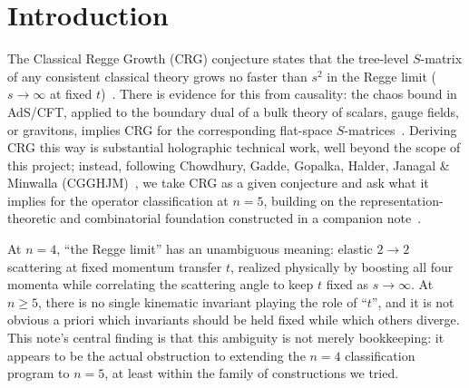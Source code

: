 \documentclass[reqno]{amsart}
\begin{document}
\maketitle
\tableofcontents

\section{Introduction}

The Classical Regge Growth (CRG) conjecture states that the tree-level $S$-matrix of any
consistent classical theory grows no faster than $s^2$ in the Regge limit ($s\to\infty$ at fixed
$t$)~\cite{cgghjm2019}. There is evidence for this from causality: the chaos bound in AdS/CFT,
applied to the boundary dual of a bulk theory of scalars, gauge fields, or gravitons, implies CRG
for the corresponding flat-space $S$-matrices~\cite{chaosbound2021}. Deriving CRG this way is
substantial holographic technical work, well beyond the scope of this project; instead, following
Chowdhury, Gadde, Gopalka, Halder, Janagal \& Minwalla (CGGHJM)~\cite{cgghjm2019}, we take CRG as a
given conjecture and ask what it implies for the operator classification at $n=5$, building on the
representation-theoretic and combinatorial foundation constructed in a companion
note~\cite{fivephotons}.

At $n=4$, ``the Regge limit'' has an unambiguous meaning: elastic $2\to2$ scattering at fixed
momentum transfer $t$, realized physically by boosting all four momenta while correlating the
scattering angle to keep $t$ fixed as $s\to\infty$. At $n\geq5$, there is no single kinematic
invariant playing the role of ``$t$'', and it is not obvious a priori which invariants should be
held fixed while which others diverge. This note's central finding is that this ambiguity is not
merely bookkeeping: it appears to be the actual obstruction to extending the $n=4$ classification
program to $n=5$, at least within the family of constructions we tried.
\end{document}

